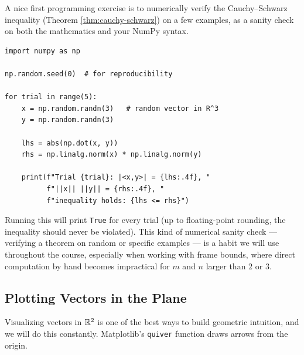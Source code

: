 A nice first programming exercise is to numerically verify the Cauchy--Schwarz inequality (Theorem \ref{thm:cauchy-schwarz}) on a few examples, as a sanity check on both the mathematics and your NumPy syntax.

\begin{lstlisting}[caption={Checking Cauchy--Schwarz on random vectors}]
import numpy as np

np.random.seed(0)  # for reproducibility

for trial in range(5):
    x = np.random.randn(3)   # random vector in R^3
    y = np.random.randn(3)

    lhs = abs(np.dot(x, y))
    rhs = np.linalg.norm(x) * np.linalg.norm(y)

    print(f"Trial {trial}: |<x,y>| = {lhs:.4f}, "
          f"||x|| ||y|| = {rhs:.4f}, "
          f"inequality holds: {lhs <= rhs}")
\end{lstlisting}

Running this will print \texttt{True} for every trial (up to floating-point rounding, the inequality should never be violated). This kind of numerical sanity check --- verifying a theorem on random or specific examples --- is a habit we will use throughout the course, especially when working with frame bounds, where direct computation by hand becomes impractical for $m$ and $n$ larger than $2$ or $3$.

\subsection{Plotting Vectors in the Plane}
\label{subsec:plotting}

Visualizing vectors in $\mathbb{R}^2$ is one of the best ways to build geometric intuition, and we will do this constantly. Matplotlib's \texttt{quiver} function draws arrows from the origin.

